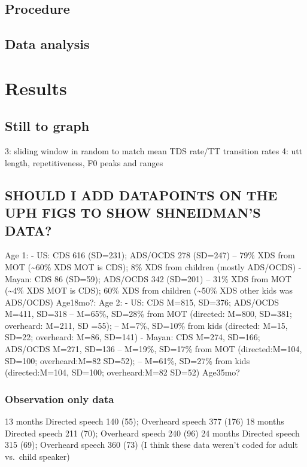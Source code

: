 \documentclass[man]{apa6}
\theoremstyle{definition}
\theoremstyle{definition}
\theoremstyle{definition}
\theoremstyle{remark}
\begin{document}
\subsection{Procedure}\label{procedure}

\subsection{Data analysis}\label{data-analysis}

\section{Results}\label{results}

\subsection{Still to graph}\label{still-to-graph}

3: sliding window in random to match mean TDS rate/TT transition rates
4: utt length, repetitiveness, F0 peaks and ranges

\subsection{SHOULD I ADD DATAPOINTS ON THE UPH FIGS TO SHOW SHNEIDMAN'S
DATA?}\label{should-i-add-datapoints-on-the-uph-figs-to-show-shneidmans-data}

Age 1: - US: CDS 616 (SD=231); ADS/OCDS 278 (SD=247) -- 79\% XDS from
MOT (\textasciitilde{}60\% XDS MOT is CDS); 8\% XDS from children
(mostly ADS/OCDS) - Mayan: CDS 86 (SD=59); ADS/OCDS 342 (SD=201) -- 31\%
XDS from MOT (\textasciitilde{}4\% XDS MOT is CDS); 60\% XDS from
children (\textasciitilde{}50\% XDS other kids was ADS/OCDS) Age18mo?:
Age 2: - US: CDS M=815, SD=376; ADS/OCDS M=411, SD=318 -- M=65\%,
SD=28\% from MOT (directed: M=800, SD=381; overheard: M=211, SD =55); --
M=7\%, SD=10\% from kids (directed: M=15, SD=22; overheard: M=86,
SD=141) - Mayan: CDS M=274, SD=166; ADS/OCDS M=271, SD=136 -- M=19\%,
SD=17\% from MOT (directed:M=104, SD=100; overheard:M=82 SD=52); --
M=61\%, SD=27\% from kids (directed:M=104, SD=100; overheard:M=82 SD=52)
Age35mo?

\subsubsection{Observation only data}\label{observation-only-data}

13 months Directed speech 140 (55); Overheard speech 377 (176) 18 months
Directed speech 211 (70); Overheard speech 240 (96) 24 months Directed
speech 315 (69); Overheard speech 360 (73) (I think these data weren't
coded for adult vs.~child speaker)
\end{document}
